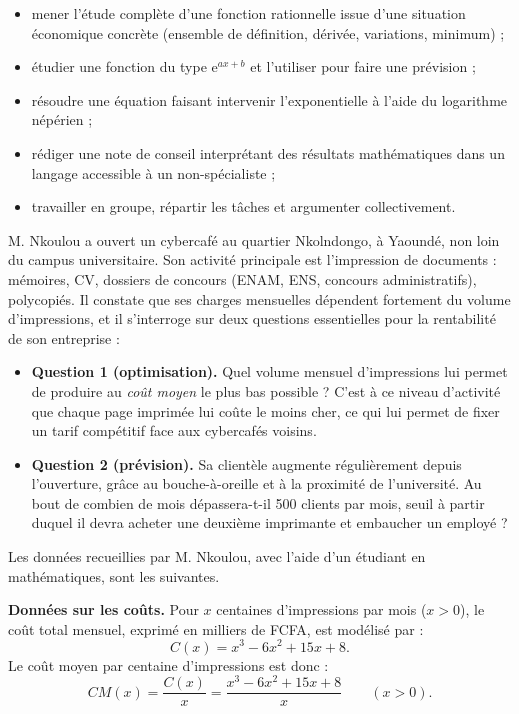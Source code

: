 \documentclass[11pt]{article}
\newcommand{\cle}[1]{{\popxbold\color{popdark}#1}}
\newcounter{popsec}
\newcounter{popsub}
\newcommand{\courssub}[1]{%
  \stepcounter{popsub}%
  \par\vspace{9pt}\noindent{\popxbold\fontsize{11.5}{13}\selectfont\color{popink}{\color{poporange}\thepopsec.\thepopsub}\hspace{6pt}#1}\par\nopagebreak\vspace{4pt}
}
\begin{document}
\begin{itemize}
\item mener l'\cle{étude complète} d'une fonction rationnelle issue d'une situation économique concrète (ensemble de définition, dérivée, variations, minimum) ;
\item étudier une fonction du type $\mathrm{e}^{ax+b}$ et l'utiliser pour faire une \cle{prévision} ;
\item résoudre une équation faisant intervenir l'exponentielle à l'aide du logarithme népérien ;
\item rédiger une note de conseil interprétant des résultats mathématiques dans un langage accessible à un non-spécialiste ;
\item travailler en groupe, répartir les tâches et argumenter collectivement.
\end{itemize}

\courssub{Situation}

M. Nkoulou a ouvert un cybercafé au quartier Nkolndongo, à Yaoundé, non loin du campus universitaire. Son activité principale est l'impression de documents : mémoires, CV, dossiers de concours (ENAM, ENS, concours administratifs), polycopiés. Il constate que ses charges mensuelles dépendent fortement du volume d'impressions, et il s'interroge sur deux questions essentielles pour la rentabilité de son entreprise :

\begin{itemize}
\item \textbf{Question 1 (optimisation).} Quel volume mensuel d'impressions lui permet de produire au \emph{coût moyen} le plus bas possible ? C'est à ce niveau d'activité que chaque page imprimée lui coûte le moins cher, ce qui lui permet de fixer un tarif compétitif face aux cybercafés voisins.
\item \textbf{Question 2 (prévision).} Sa clientèle augmente régulièrement depuis l'ouverture, grâce au bouche-à-oreille et à la proximité de l'université. Au bout de combien de mois dépassera-t-il 500 clients par mois, seuil à partir duquel il devra acheter une deuxième imprimante et embaucher un employé ?
\end{itemize}

Les données recueillies par M. Nkoulou, avec l'aide d'un étudiant en mathématiques, sont les suivantes.

\textbf{Données sur les coûts.} Pour $x$ centaines d'impressions par mois ($x > 0$), le coût total mensuel, exprimé en milliers de FCFA, est modélisé par :
\[ C(x) = x^3 - 6x^2 + 15x + 8. \]
Le \cle{coût moyen} par centaine d'impressions est donc :
\[ CM(x) = \dfrac{C(x)}{x} = \dfrac{x^3 - 6x^2 + 15x + 8}{x} \qquad (x > 0). \]
\end{document}
